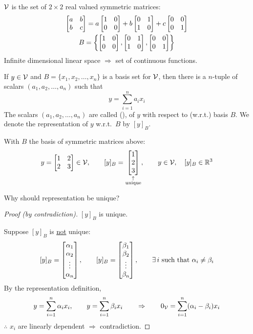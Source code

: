 \begin{example}
$\mathcal{V}$ is the set of $2\times2$ real valued symmetric matrices:
\begin{gather*}
\begin{bmatrix}a&b\\b&c\end{bmatrix} = a\begin{bmatrix}1&0\\0&0\end{bmatrix}+b\begin{bmatrix}0&1\\1&0\end{bmatrix}+c\begin{bmatrix}0&0\\0&1\end{bmatrix}\\
B = \left\{ \begin{bmatrix}1&0\\0&0\end{bmatrix},\begin{bmatrix}0&1\\1&0\end{bmatrix},\begin{bmatrix}0&0\\0&1\end{bmatrix} \right\}
\end{gather*}
\point Infinite dimensional linear space $\Rightarrow$ set of continuous functions.
\end{example}

\begin{definition}
If $y\in\mathcal{V}$ and $B=\{x_1,x_2,\dots,x_n\}$ is a basis set for $\mathcal{V}$, then there is a  $n$-tuple of scalars $(a_1,a_2,\dots,a_n)$ such that
\[ y = \sum_{i=1}^{n} a_ix_i \]
The scalars $(a_1,a_2,\dots,a_n)$ are called  (),  of $y$ with respect to (w.r.t.) basis $B$. We denote the representation of $y$ w.r.t.\ $B$ by $[y]_B$.
\end{definition}
With $B$ the basis of symmetric matrices above:
\[
y = \begin{bmatrix}1&2\\2&3\end{bmatrix}\in\mathcal{V}, \qquad [y]_B = \underset{\substack{\uparrow\\\text{unique}}}{\begin{bmatrix}1\\2\\3\end{bmatrix}}, \qquad y\in\mathcal{V}, \quad [y]_B\in\mathbb{R}^3
\]

\point Why should representation be unique?
\begin{proof}[Proof (by contradiction)]
$[y]_B$ is unique.

Suppose $[y]_B$ is \underline{not} unique:
\[
[y]_B = \begin{bmatrix}\alpha_1\\\alpha_2\\\vdots\\\alpha_n\end{bmatrix}, \qquad [y]_B = \begin{bmatrix}\beta_1\\\beta_2\\\vdots\\\beta_n\end{bmatrix}, \qquad \exists\, i \text{ such that } \alpha_i\neq\beta_i
\]
By the representation definition,
\[
y = \sum_{i=1}^{n}\alpha_ix_i, \qquad y=\sum_{i=1}^{n}\beta_ix_i
\qquad\Rightarrow\qquad
0_{\mathcal{V}} = \sum_{i=1}^{n}(\alpha_i-\beta_i)x_i
\]
$\therefore$ $x_i$ are linearly dependent $\Rightarrow$ contradiction.
\end{proof}

